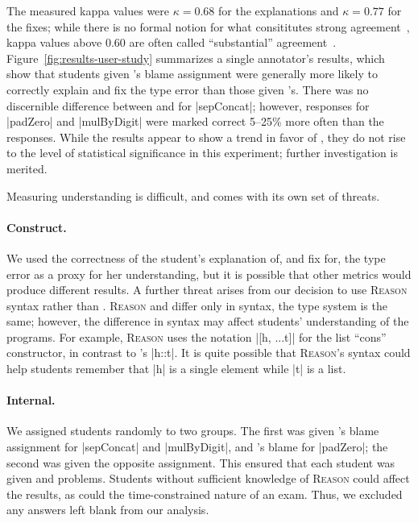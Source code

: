 %
The measured kappa values were $\kappa = 0.68$ for the explanations and
$\kappa = 0.77$ for the fixes; while there is no formal notion for what
consititutes strong agreement~\cite{Krippendorff2012-wd}, kappa values
above $0.60$ are often called ``substantial''
agreement~\cite{Landis1977-ey}.
%
Figure~\ref{fig:results-user-study} summarizes a single annotator's
results, which show that students given \toolname's blame assignment
were generally more likely to correctly explain and fix the type error
than those given \sherrloc's.
%
There was no discernible difference between \toolname and
\sherrloc for |sepConcat|; however, \toolname responses for |padZero| and
|mulByDigit| were marked correct 5--25\% more often than the \sherrloc
responses.
%
While the results appear to show a trend in favor of \toolname,
they do not rise to the level of statistical significance
in this experiment; further investigation is merited.
%

%
Measuring understanding is difficult, and comes with its own
set of threats. %

\paragraph{Construct.}
%
We used the correctness of the student's explanation of, and fix for,
the type error as a proxy for her understanding, but it is possible
that other metrics would produce different results.
%
A further threat arises from our decision to use \textsc{Reason} syntax
rather than \ocaml.
%
\textsc{Reason} and \ocaml differ only in syntax, the type system is the
same; however, the difference in syntax may affect students'
understanding of the programs.
%
For example, \textsc{Reason} uses the notation |[h, ...t]| for the list
``cons'' constructor, in contrast to \ocaml's |h::t|.
%
It is quite possible that \textsc{Reason}'s syntax could help students
remember that |h| is a single element while |t| is a list.

\paragraph{Internal.}
%
We assigned students randomly to two groups. The first was given
\sherrloc's blame assignment for |sepConcat| and |mulByDigit|, and
\toolname's blame for |padZero|; the second was given the opposite
assignment. This ensured that each student was given \sherrloc and
\toolname problems. Students without sufficient knowledge of
\textsc{Reason} could affect the results, as could the time-constrained
nature of an exam. Thus, we excluded any answers left blank
from our analysis.

